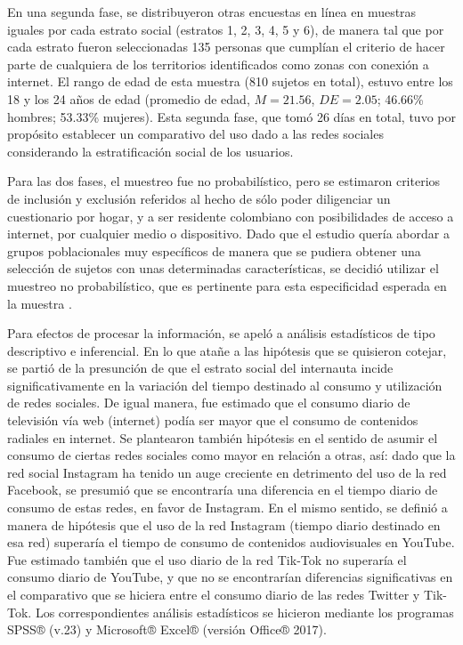 \documentclass[spanish]{textolivre}
\begin{document}
En una segunda fase, se distribuyeron otras encuestas en línea en muestras iguales por cada estrato social (estratos 1, 2, 3, 4, 5 y 6), de manera tal que por cada estrato fueron seleccionadas 135 personas que cumplían el criterio de hacer parte de cualquiera de los territorios identificados como zonas con conexión a internet. El rango de edad de esta muestra (810 sujetos en total), estuvo entre los 18 y los 24 años de edad (promedio de edad, $M = 21.56$, $DE = 2.05$; 46.66\% hombres; 53.33\% mujeres). Esta segunda fase, que tomó 26 días en total, tuvo por propósito establecer un comparativo del uso dado a las redes sociales considerando la estratificación social de los usuarios.

Para las dos fases, el muestreo fue no probabilístico, pero se estimaron criterios de inclusión y exclusión referidos al hecho de sólo poder diligenciar un cuestionario por hogar, y a ser residente colombiano con posibilidades de acceso a internet, por cualquier medio o dispositivo. Dado que el estudio quería abordar a grupos poblacionales muy específicos de manera que se pudiera obtener una selección de sujetos con unas determinadas características, se decidió utilizar el muestreo no probabilístico, que es pertinente para esta especificidad esperada en la muestra \cite{lastra2000}.

Para efectos de procesar la información, se apeló a análisis estadísticos de tipo descriptivo e inferencial. En lo que atañe a las hipótesis que se quisieron cotejar, se partió de la presunción de que el estrato social del internauta incide significativamente en la variación del tiempo destinado al consumo y utilización de redes sociales. De igual manera, fue estimado que el consumo diario de televisión vía web (internet) podía ser mayor que el consumo de contenidos radiales en internet. Se plantearon también hipótesis en el sentido de asumir el consumo de ciertas redes sociales como mayor en relación a otras, así: dado que la red social Instagram ha tenido un auge creciente en detrimento del uso de la red Facebook, se presumió que se encontraría una diferencia en el tiempo diario de consumo de estas redes, en favor de Instagram. En el mismo sentido, se definió a manera de hipótesis que el uso de la red Instagram (tiempo diario destinado en esa red) superaría el tiempo de consumo de contenidos audiovisuales en YouTube. Fue estimado también que el uso diario de la red Tik-Tok no superaría el consumo diario de YouTube, y que no se encontrarían diferencias significativas en el comparativo que se hiciera entre el consumo diario de las redes Twitter y Tik-Tok. Los correspondientes análisis estadísticos se hicieron mediante los programas SPSS® (v.23) y Microsoft® Excel® (versión Office® 2017).
\end{document}
